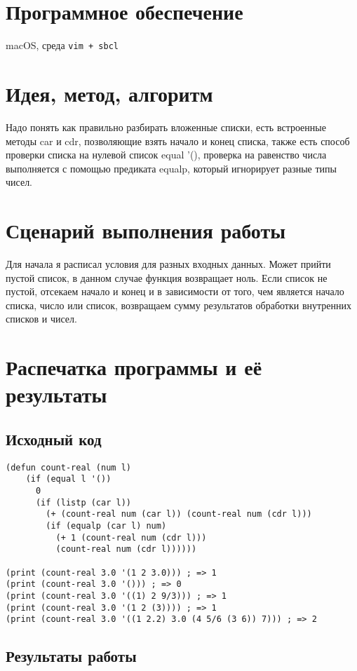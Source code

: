 \documentclass[15pt]{extarticle}
\begin{document}
\section{Программное обеспечение}
macOS, среда {\tt vim + sbcl}

\section{Идея, метод, алгоритм}
Надо понять как правильно разбирать вложенные списки, есть встроенные методы car и cdr, позволяющие взять начало и конец списка, также есть способ проверки списка на нулевой список equal '(), проверка на равенство числа выполняется с помощью предиката equalp, который игнорирует разные типы чисел.

\section{Сценарий выполнения работы}
Для начала я расписал условия для разных входных данных. Может прийти пустой список, в данном случае функция возвращает ноль. Если список не пустой, отсекаем начало и конец и в зависимости от того, чем является начало списка, число или список, возвращаем сумму результатов обработки внутренних списков и чисел.

\section{Распечатка программы и её результаты}

\subsection{Исходный код}

\begin{lstlisting}
(defun count-real (num l)
    (if (equal l '())
      0
      (if (listp (car l))
        (+ (count-real num (car l)) (count-real num (cdr l)))
        (if (equalp (car l) num)
          (+ 1 (count-real num (cdr l)))
          (count-real num (cdr l))))))

(print (count-real 3.0 '(1 2 3.0))) ; => 1
(print (count-real 3.0 '())) ; => 0
(print (count-real 3.0 '((1) 2 9/3))) ; => 1
(print (count-real 3.0 '(1 2 (3)))) ; => 1
(print (count-real 3.0 '((1 2.2) 3.0 (4 5/6 (3 6)) 7))) ; => 2
\end{lstlisting}

\subsection{Результаты работы}
\end{document}
